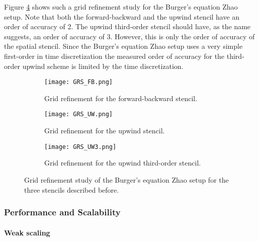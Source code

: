 Figure \ref{fig:grs} shows such a grid refinement study for the Burger's equation Zhao setup.
Note that both the forward-backward and the upwind stencil have an order of accuracy of 2.
The upwind third-order stencil should have, as the name suggests, an order of accuracy of 3.
However, this is only the order of accuracy of the spatial stencil.
Since the Burger's equation Zhao setup uses a very simple first-order in time discretization the measured order of accuracy for the third-order upwind scheme is limited by the time discretization.

\begin{figure}[!htbp]
\centering
\begin{subfigure}{0.8\textwidth}
  \centering
  \texttt{[image: GRS\_FB.png]}
  \caption{Grid refinement for the forward-backward stencil.}
  \label{fig:grs_1}
\end{subfigure}

\begin{subfigure}{0.8\textwidth}
  \centering
  \texttt{[image: GRS\_UW.png]}
  \caption{Grid refinement for the upwind stencil.}
  \label{fig:grs_2}
\end{subfigure}

\begin{subfigure}{0.8\textwidth}
  \centering
  \texttt{[image: GRS\_UW3.png]}
  \caption{Grid refinement for the upwind third-order stencil.}
  \label{fig:grs_3}
\end{subfigure}
\caption{Grid refinement study of the Burger's equation Zhao setup for the three stencils described before.}
\label{fig:grs}
\end{figure}

\subsubsection{Performance and Scalability}

\paragraph{Weak scaling}

